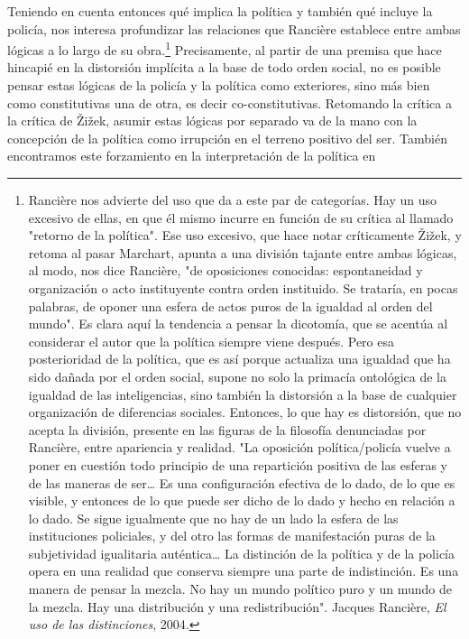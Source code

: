 Teniendo en cuenta entonces qué implica la política y también qué
incluye la policía, nos interesa profundizar las relaciones que Rancière
establece entre ambas lógicas a lo largo de su obra.\footnote{Rancière
  nos advierte del uso que da a este par de categorías. Hay un uso
  excesivo de ellas, en que él mismo incurre en función de su crítica al
  llamado "retorno de la política". Ese uso excesivo, que hace notar
  críticamente Žižek, y retoma al pasar Marchart, apunta a una división
  tajante entre ambas lógicas, al modo, nos dice Rancière, "de
  oposiciones conocidas: espontaneidad y organización o acto
  instituyente contra orden instituido. Se trataría, en pocas palabras,
  de oponer una esfera de actos puros de la igualdad al orden del
  mundo". Es clara aquí la tendencia a pensar la dicotomía, que se
  acentúa al considerar el autor que la política siempre viene después.
  Pero esa posterioridad de la política, que es así porque actualiza una
  igualdad que ha sido dañada por el orden social, supone no solo la
  primacía ontológica de la igualdad de las inteligencias, sino también
  la distorsión a la base de cualquier organización de diferencias
  sociales. Entonces, lo que hay es distorsión, que no acepta la
  división, presente en las figuras de la filosofía denunciadas por
  Rancière, entre apariencia y realidad. "La oposición política/policía
  vuelve a poner en cuestión todo principio de una repartición positiva
  de las esferas y de las maneras de ser\ldots{} Es una configuración
  efectiva de lo dado, de lo que es visible, y entonces de lo que puede
  ser dicho de lo dado y hecho en relación a lo dado. Se sigue
  igualmente que no hay de un lado la esfera de las instituciones
  policiales, y del otro las formas de manifestación puras de la
  subjetividad igualitaria auténtica\ldots{} La distinción de la
  política y de la policía opera en una realidad que conserva siempre
  una parte de indistinción. Es una manera de pensar la mezcla. No hay
  un mundo político puro y un mundo de la mezcla. Hay una distribución y
  una redistribución". Jacques Rancière, \emph{El uso de las
  distinciones}, 2004.} Precisamente, al partir de una premisa que hace
hincapié en la distorsión implícita a la base de todo orden social, no
es posible pensar estas lógicas de la policía y la política como
exteriores, sino más bien como constitutivas una de otra, es decir
co-constitutivas. Retomando la crítica a la crítica de Žižek, asumir
estas lógicas por separado va de la mano con la concepción de la
política como irrupción en el terreno positivo del ser. También
encontramos este forzamiento en la interpretación de la política en
